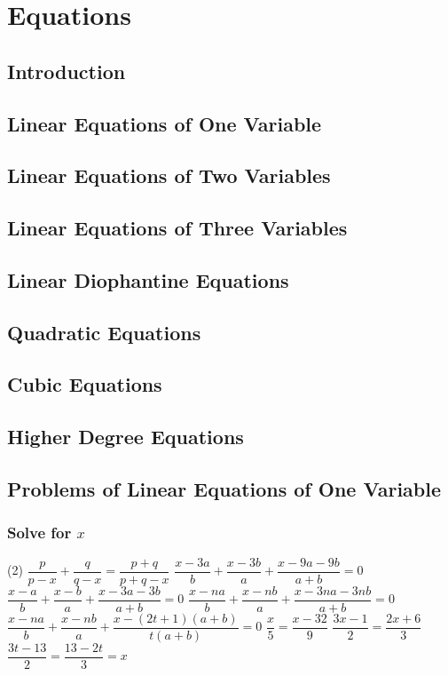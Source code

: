 \chapter{Equations}

\section{Introduction}
\section{Linear Equations of One Variable}
\section{Linear Equations of Two Variables}
\section{Linear Equations of Three Variables}
\section{Linear Diophantine Equations}
\section{Quadratic Equations}
\section{Cubic Equations}
\section{Higher Degree Equations}
\section{Problems of Linear Equations of One Variable}
\subsection*{Solve for $x$}
\begin{tasks}[label = \arabic*.,label-width = 1.5em](2) %
    \task $\dfrac{p}{p-x}+\dfrac{q}{q-x}= \dfrac{p+q}{p+q-x}$
    \task $\dfrac{x-3a}{b}+\dfrac{x-3b}{a}+\dfrac{x-9a-9b}{a+b}=0$
    \task $\dfrac{x-a}{b}+\dfrac{x-b}{a}+\dfrac{x-3a-3b}{a+b}=0$
    \task $\dfrac{x-na}{b}+\dfrac{x-nb}{a}+\dfrac{x-3na-3nb}{a+b}=0$
    \task $\dfrac{x-na}{b}+\dfrac{x-nb}{a}+\dfrac{x-(2t+1)(a+b)}{t(a+b)}=0$
    \task $\dfrac{x}{5}=\dfrac{x-32}{9}$
    \task $\dfrac{3x-1}{2}=\dfrac{2x+6}{3}$
    \task $\dfrac{3t-13}{2}=\dfrac{13-2t}{3}=x$

\end{tasks}
\newpage
